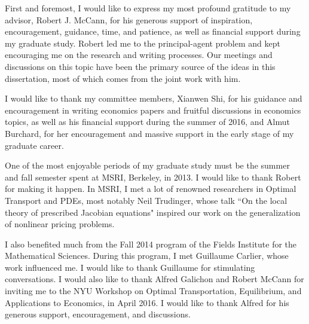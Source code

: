 \documentclass{ut-thesis}[10pt]
\theoremstyle{plain}
\theoremstyle{definition}
\theoremstyle{remark}
\numberwithin{equation}{section}
\begin{document}
\begin{preliminary}

\begin{acknowledgements}

First and foremost, I would like to express my most profound gratitude to my advisor, Robert J. McCann, for his generous support of inspiration, encouragement, guidance, time, and patience, as well as financial support during my graduate study. Robert led me to the principal-agent problem and kept encouraging me on the research and writing processes. Our meetings and discussions on this topic have been the primary source of the ideas in this dissertation, most of which comes from the joint work with him.\medskip

I would like to thank my committee members, Xianwen Shi, for his guidance and encouragement in writing economics papers and fruitful discussions in economics topics, as well as his financial support during the summer of 2016, and Almut Burchard, for her encouragement and massive support in the early stage of my graduate career.\medskip

One of the most enjoyable periods of my graduate study must be the summer and fall semester spent at MSRI, Berkeley, in 2013. I would like to thank Robert for making it happen. In MSRI, I met a lot of renowned researchers in Optimal Transport and PDEs, %
most notably Neil Trudinger, whose talk ``On the local theory of prescribed Jacobian equations" inspired our work on the generalization of nonlinear pricing problems.    \medskip

I also benefited much from the Fall 2014 program of the Fields Institute for the Mathematical Sciences. During this program, I met Guillaume Carlier, whose work influenced me. I would like to thank Guillaume for stimulating conversations. I would also like to thank Alfred Galichon and Robert McCann for inviting me to the NYU Workshop on Optimal Transportation, Equilibrium, and Applications to Economics, in April 2016. I would like to thank Alfred for his generous support, encouragement, and discussions.\medskip


\end{acknowledgements}
\end{preliminary}
\end{document}
